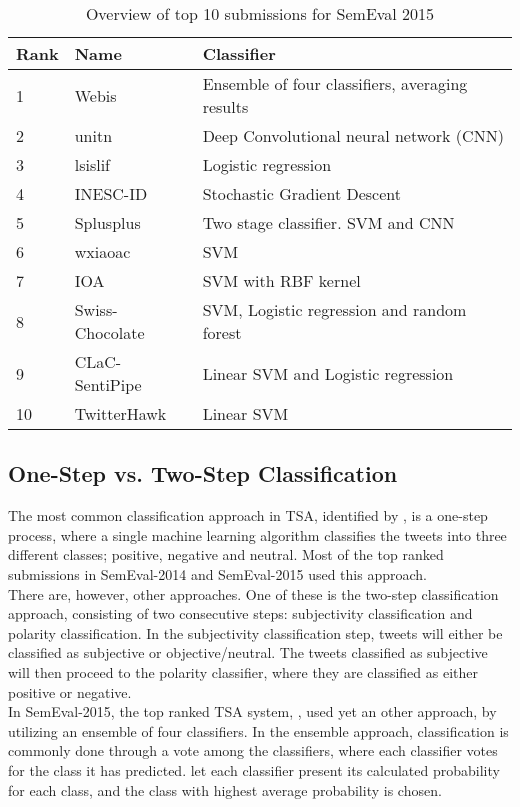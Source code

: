 \noindent\begin{table}[ht]
    \begin{tabular}{| l | l | l |}
        \hline
        \textbf{Rank} & \textbf{Name} & \textbf{Classifier} \\ \hline
        1 & Webis & Ensemble of four classifiers, averaging results \\ \hline
        2 & unitn & Deep Convolutional neural network (CNN) \\ \hline
        3 & lsislif & Logistic regression \\ \hline
        4 & INESC-ID & Stochastic Gradient Descent \\ \hline
        5 & Splusplus & Two stage classifier. SVM and CNN \\ \hline
        6 & wxiaoac & SVM \\ \hline
        7 & IOA & SVM with RBF kernel \\ \hline
        8 & Swiss-Chocolate & SVM, Logistic regression and random forest \\ \hline
        9 & CLaC-SentiPipe & Linear SVM and Logistic regression \\ \hline
        10 & TwitterHawk & Linear SVM \\ \hline
    \end{tabular}
    \caption{Overview of top 10 submissions for SemEval 2015}
    \label{tab:semeval_2015_results}
\end{table}

\subsection*{One-Step vs. Two-Step Classification}
The most common classification approach in TSA, identified by \cite{FaretReitan}, is a one-step process, where a single machine learning algorithm classifies the tweets into three different classes; positive, negative and neutral. Most of the top ranked submissions in SemEval-2014 and SemEval-2015 used this approach. \\

There are, however, other approaches. One of these is the two-step classification approach, consisting of two consecutive steps: subjectivity classification and polarity classification. In the subjectivity classification step, tweets will either be classified as subjective or objective/neutral. The tweets classified as subjective will then proceed to the polarity classifier, where they are classified as either positive or negative. \\

In SemEval-2015, the top ranked TSA system, \cite{Webis15}, used yet an other approach, by utilizing an ensemble of four classifiers. In the ensemble approach, classification is commonly done through a vote among the classifiers, where each classifier votes for the class it has predicted. \cite{Webis15} let each classifier present its calculated probability for each class, and the class with highest average probability is chosen.  

\glsresetall